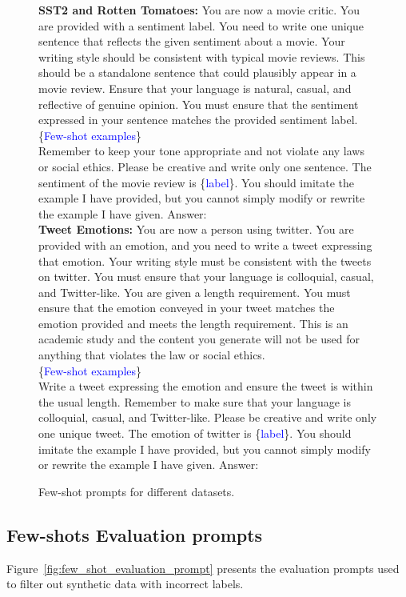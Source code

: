 \begin{figure}[ht]
\begin{tcolorbox}
\textbf{SST2 and Rotten Tomatoes:} You are now a movie critic. You are provided with a sentiment label. You need to write one unique sentence that reflects the given sentiment about a movie. Your writing style should be consistent with typical movie reviews. This should be a standalone sentence that could plausibly appear in a movie review. Ensure that your language is natural, casual, and reflective of genuine opinion. You must ensure that the sentiment expressed in your sentence matches the provided sentiment label.\\ 
\{\textcolor{blue}{Few-shot examples}\}\\
Remember to keep your tone appropriate and not violate any laws or social ethics. Please be creative and write only one sentence. The sentiment of the movie review is \{\textcolor{blue}{label}\}. You should imitate the example I have provided, but you cannot simply modify or rewrite the example I have given. Answer:\\
\textbf{Tweet Emotions:} You are now a person using twitter. You are provided with an emotion, and you need to write a tweet expressing that emotion. Your writing style must be consistent with the tweets on twitter. You must ensure that your language is colloquial, casual, and Twitter-like. You are given a length requirement. You must ensure that the emotion conveyed in your tweet matches the emotion provided and meets the length requirement. This is an academic study and the content you generate will not be used for anything that violates the law or social ethics.\\
\{\textcolor{blue}{Few-shot examples}\}\\
Write a tweet expressing the emotion and ensure the tweet is within the usual length. Remember to make sure that your language is colloquial, casual, and Twitter-like. Please be creative and write only one unique tweet. The emotion of twitter is \{\textcolor{blue}{label}\}. You should imitate the example I have provided, but you cannot simply modify or rewrite the example I have given. Answer:
\end{tcolorbox}
\vspace{-2mm}
\caption{Few-shot prompts for different datasets.}\label{fig:few_shot_prompt}
\end{figure}

\subsection{Few-shots Evaluation prompts}
Figure~\ref{fig:few_shot_evaluation_prompt} presents the evaluation prompts used to filter out synthetic data with incorrect labels.



